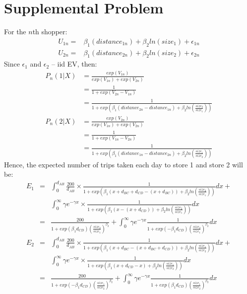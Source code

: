 \documentclass[11pt]{article}
\begin{document}
\section{Supplemental Problem}
For the $n$th shopper:
\begin{equation}
\begin{array}{ll}
U_{1n}=&\beta_1(distance_{1n})+\beta_2ln(size_1)+\epsilon_{1n}\\
U_{2n}=&\beta_1(distance_{2n})+\beta_2ln(size_2)+\epsilon_{2n}
\end{array}
\end{equation}
Since $\epsilon_1$ and $\epsilon_2$ -- iid EV, then:
\begin{equation}
\begin{array}{ll}
P_n(1|X)&=\frac{exp(V_{1n})}{exp(V_{1n})+exp(V_{2n})}\\
&=\frac{1}{1+exp(V_{2n}-V_{1n})}\\
&=\frac{1}{1+exp(\beta_1(distance_{2n}-distance_{1n})+\beta_2ln\left(\frac{size_2}{size_1}\right))}
\end{array}
\end{equation}
\begin{equation}
\begin{array}{ll}
P_n(2|X)&=\frac{exp(V_{2n})}{exp(V_{1n})+exp(V_{2n})}\\
&=\frac{1}{1+exp(V_{1n}-V_{2n})}\\
&=\frac{1}{1+exp(\beta_1(distance_{1n}-distance_{2n})+\beta_2ln\left(\frac{size_1}{size_2}\right))}
\end{array}
\end{equation}
Hence, the expected number of trips taken each day to store 1 and store 2 will be:
\begin{equation}
\begin{array}{lll}
E_1&=&\int_{0}^{d_{AB}}\frac{200}{d_{AB}}\times\frac{1}{1+exp(\beta_1(x+d_{BC}+d_{CD}-(x+d_{BC}))+\beta_2ln\left(\frac{size_2}{size_1}\right))}dx+\\
&&\int_{0}^{\infty}\gamma e^{-\gamma x}\times \frac{1}{1+exp(\beta_1(x-(x+d_{CD}))+\beta_2ln\left(\frac{size_2}{size_1}\right))}dx\\
&=&\frac{200}{1+exp(\beta_1d_{CD})\left(\frac{size_2}{size_1}\right)^{\beta_2}}+\int_{0}^{\infty}\gamma e^{-\gamma x}\frac{1}{1+exp(-\beta_1d_{CD})\left(\frac{size_2}{size_1}\right)^{\beta_2}}dx
\end{array}
\end{equation}
\begin{equation}
\begin{array}{lll}
E_2&=&\int_{0}^{d_{AB}}\frac{200}{d_{AB}}\times\frac{1}{1+exp(\beta_1(x+d_{BC}-(x+d_{BC}+d_{CD}))+\beta_2ln\left(\frac{size_1}{size_2}\right))}dx+\\
&&\int_{0}^{\infty}\gamma e^{-\gamma x}\times \frac{1}{1+exp(\beta_1(x+d_{CD}-x)+\beta_2ln\left(\frac{size_1}{size_2}\right))}dx\\
&=&\frac{200}{1+exp(-\beta_1d_{CD})\left(\frac{size_1}{size_2}\right)^{\beta_2}}+\int_{0}^{\infty}\gamma e^{-\gamma x}\frac{1}{1+exp(\beta_1d_{CD})\left(\frac{size_1}{size_2}\right)^{\beta_2}}dx
\end{array}
\end{equation}
\end{document}
